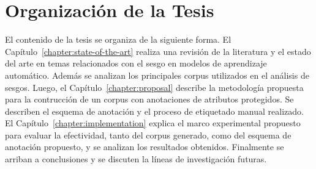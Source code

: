 \section*{Organizaci\'on de la Tesis}
El contenido de la tesis se organiza de la siguiente forma. El Cap\'itulo~\ref{chapter:state-of-the-art} realiza una revisi\'on de 
la literatura y el estado del arte en temas relacionados con el sesgo en modelos de aprendizaje autom\'atico. Adem\'as se analizan 
los principales corpus utilizados en el an\'alisis de sesgos. Luego, el Cap\'itulo~\ref{chapter:proposal} describe la metodolog\'ia 
propuesta para la contrucci\'on de un corpus con anotaciones de atributos protegidos. Se describen el esquema de anotaci\'on y el 
proceso de etiquetado manual realizado. El Cap\'itulo~\ref{chapter:implementation} explica el marco experimental propuesto para 
evaluar la efectividad, tanto del corpus generado, como del esquema de anotaci\'on propuesto, y se analizan los resultados obtenidos. 
Finalmente se arriban a conclusiones y se discuten la l\'ineas de investigaci\'on futuras.  
